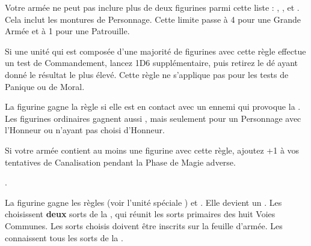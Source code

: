 \newcommand{\chillaurarule}{%
Les unités ennemies en contact avec au moins une figurine avec cette règle subissent des malus de -3 en Initiative et -1 en Force, jusqu'à un minimum de 1.
}










\startarmyspecialrules

\armyspecialruleentry{\lastoftheirkind}

Votre armée ne peut pas inclure plus de deux figurines parmi cette liste : \youngdragons{}, \dragons{}, \firephoenixes{} et \frostphoenixes{}. Cela inclut les montures de Personnage. Cette limite passe à 4 pour une Grande Armée et à 1 pour une Patrouille.

\armyspecialruleentry{\martialdiscipline}

Si une unité qui est composée d'une majorité de figurines avec cette règle effectue un test de Commandement, lancez 1D6 supplémentaire, puis retirez le dé ayant donné le résultat le plus élevé. Cette règle ne s'applique pas pour les tests de Panique ou de Moral.

\armyspecialruleentry{\valiant}

La figurine gagne la règle \stubborn{} si elle est en contact avec un ennemi qui provoque la \fear{}. Les figurines ordinaires gagnent aussi \bodyguard{\highprince{}, \commander{}}, mais seulement pour un Personnage avec l’Honneur \royalhuntsman{} ou n'ayant pas choisi d'Honneur.

\armyspecialruleentry{\masterofbalance}

Si votre armée contient au moins une figurine avec cette règle, ajoutez +1 à vos tentatives de Canalisation pendant la Phase de Magie adverse.


\closearmyspecialrules








\newpage
{}

\vspace{0.5cm}

\hfill
{}\oneofakind{}.\vspace{5pt}

La figurine gagne les règles \swordsworn{} (voir l'unité spéciale \swordmasters{}) et \masterofbalance{}. Elle devient un \textbf{}. Les \commanders{} choisissent \textbf{deux} sorts de la \Pathof{} \eightpaths{}, qui réunit les sorts primaires des huit Voies Communes. Les sorts choisis doivent être inscrits sur la feuille d'armée. Les \highprinces{} connaissent tous les sorts de la \Pathof{} \eightpaths{}.

